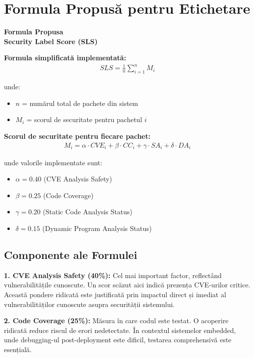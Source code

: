 \documentclass[12pt,a4paper]{article}
\newenvironment{formulabox}{%
\begin{leftbar}
\color{black}
\textbf{Formula Propusa}\\[0.5em]
}{%
\end{leftbar}
}
\begin{document}
\section{Formula Propusă pentru Etichetare}

\begin{formulabox}
\textbf{Security Label Score (SLS)}

\textbf{Formula simplificată implementată:}
\begin{align}
SLS = \frac{1}{n} \sum_{i=1}^{n} M_i
\end{align}

unde:
\begin{itemize}
\item $n$ = numărul total de pachete din sistem
\item $M_i$ = scorul de securitate pentru pachetul $i$
\end{itemize}

\textbf{Scorul de securitate pentru fiecare pachet:}
\begin{align}
M_i = \alpha \cdot CVE_i + \beta \cdot CC_i + \gamma \cdot SA_i + \delta \cdot DA_i
\end{align}

unde valorile implementate sunt:
\begin{itemize}
\item $\alpha = 0.40$ (CVE Analysis Safety)
\item $\beta = 0.25$ (Code Coverage)
\item $\gamma = 0.20$ (Static Code Analysis Status)
\item $\delta = 0.15$ (Dynamic Program Analysis Status)
\end{itemize}
\end{formulabox}

\subsection{Componente ale Formulei}

\textbf{1. CVE Analysis Safety (40\%):} Cel mai important factor, reflectând vulnerabilitățile cunoscute. Un scor scăzut aici indică prezența CVE-urilor critice. Această pondere ridicată este justificată prin impactul direct și imediat al vulnerabilităților cunoscute asupra securității sistemului.

\textbf{2. Code Coverage (25\%):} Măsura în care codul este testat. O acoperire ridicată reduce riscul de erori nedetectate. În contextul sistemelor embedded, unde debugging-ul post-deployment este dificil, testarea comprehensivă este esențială.
\end{document}
